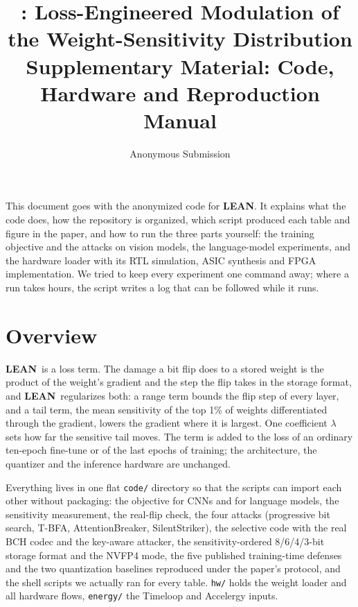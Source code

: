 \documentclass[11pt]{article}
\title{\textbf{\lean: Loss-Engineered Modulation of the Weight-Sensitivity Distribution}\\[4pt]
\large Supplementary Material: Code, Hardware and Reproduction Manual}
\author{Anonymous Submission}
\date{}
\newcommand{\lean}{\textsf{\textbf{LEAN}}}
\begin{document}
\maketitle\thispagestyle{fancy}

\begin{center}
\end{center}
\vspace{6pt}

This document goes with the anonymized code for \lean. It explains what the code does, how the repository is organized, which script produced each table and figure in the paper, and how to run the three parts yourself: the training objective and the attacks on vision models, the language-model experiments, and the hardware loader with its RTL simulation, ASIC synthesis and FPGA implementation. We tried to keep every experiment one command away; where a run takes hours, the script writes a log that can be followed while it runs.

\tableofcontents

\section{Overview}
\lean\ is a loss term. The damage a bit flip does to a stored weight is the product of the weight's gradient and the step the flip takes in the storage format, and \lean\ regularizes both: a range term bounds the flip step of every layer, and a tail term, the mean sensitivity of the top 1\% of weights differentiated through the gradient, lowers the gradient where it is largest. One coefficient $\lambda$ sets how far the sensitive tail moves. The term is added to the loss of an ordinary ten-epoch fine-tune or of the last epochs of training; the architecture, the quantizer and the inference hardware are unchanged.

Everything lives in one flat \texttt{code/} directory so that the scripts can import each other without packaging: the objective for CNNs and for language models, the sensitivity measurement, the real-flip check, the four attacks (progressive bit search, T-BFA, AttentionBreaker, SilentStriker), the selective code with the real BCH codec and the key-aware attacker, the sensitivity-ordered 8/6/4/3-bit storage format and the NVFP4 mode, the five published training-time defenses and the two quantization baselines reproduced under the paper's protocol, and the shell scripts we actually ran for every table. \texttt{hw/} holds the weight loader and all hardware flows, \texttt{energy/} the Timeloop and Accelergy inputs.
\end{document}
